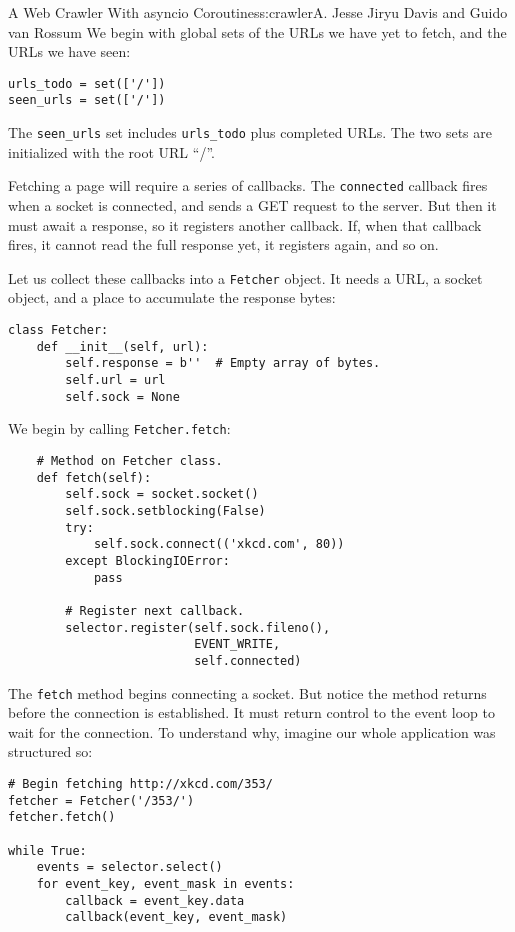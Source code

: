 \begin{aosachapter}{A Web Crawler With asyncio Coroutines}{s:crawler}{A. Jesse Jiryu Davis and Guido van Rossum}
We begin with global sets of the URLs we have yet to fetch, and the URLs
we have seen:

\begin{verbatim}
urls_todo = set(['/'])
seen_urls = set(['/'])
\end{verbatim}

The \texttt{seen\_urls} set includes \texttt{urls\_todo} plus completed
URLs. The two sets are initialized with the root URL ``/''.

Fetching a page will require a series of callbacks. The
\texttt{connected} callback fires when a socket is connected, and sends
a GET request to the server. But then it must await a response, so it
registers another callback. If, when that callback fires, it cannot read
the full response yet, it registers again, and so on.

Let us collect these callbacks into a \texttt{Fetcher} object. It needs
a URL, a socket object, and a place to accumulate the response bytes:

\begin{verbatim}
class Fetcher:
    def __init__(self, url):
        self.response = b''  # Empty array of bytes.
        self.url = url
        self.sock = None
\end{verbatim}

We begin by calling \texttt{Fetcher.fetch}:

\begin{verbatim}
    # Method on Fetcher class.
    def fetch(self):
        self.sock = socket.socket()
        self.sock.setblocking(False)
        try:
            self.sock.connect(('xkcd.com', 80))
        except BlockingIOError:
            pass
            
        # Register next callback.
        selector.register(self.sock.fileno(),
                          EVENT_WRITE,
                          self.connected)
\end{verbatim}

The \texttt{fetch} method begins connecting a socket. But notice the
method returns before the connection is established. It must return
control to the event loop to wait for the connection. To understand why,
imagine our whole application was structured so:

\begin{verbatim}
# Begin fetching http://xkcd.com/353/
fetcher = Fetcher('/353/')
fetcher.fetch()

while True:
    events = selector.select()
    for event_key, event_mask in events:
        callback = event_key.data
        callback(event_key, event_mask)
\end{verbatim}


\end{aosachapter}
